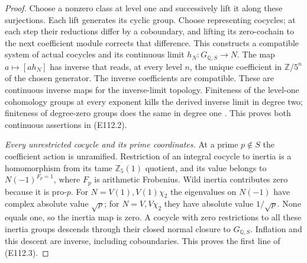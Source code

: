 \begin{proof}
Choose a nonzero class at level one and successively lift
it along these surjections.  Each lift generates its cyclic
group.  Choose representing cocycles; at each step their
reductions differ by a coboundary, and lifting its zero-cochain
to the next coefficient module corrects that difference.
This constructs a compatible system of actual cocycles and
its continuous limit $h_N:G_{\mathbb Q,S}\to N$.
The map $a\mapsto[a h_N]$ has inverse that reads, at every
level $n$, the unique coefficient in $\mathbb Z/5^n$ of
the chosen generator.  The inverse coefficients are compatible.
These are continuous inverse maps for the inverse-limit
topology.  Finiteness of the level-one cohomology groups at
every exponent kills the derived inverse limit in degree two;
finiteness of degree-zero groups does the same in degree one
\cite[Proposition 1.6 and Theorem 2.2]{E_JannsenContinuous}.
This proves both continuous assertions in (E112.2).

\emph{Every unrestricted cocycle and its prime coordinates.}
At a prime $p\notin S$ the coefficient action is unramified.
Restriction of an integral cocycle to inertia is a homomorphism
from its tame $\mathbb Z_5(1)$ quotient, and its value belongs
to $N(-1)^{F_p=1}$, where $F_p$ is arithmetic Frobenius.
Wild inertia contributes zero because it is pro-$p$.
For $N=V(1),V(1)\chi_2$ the eigenvalues on $N(-1)$ have
complex absolute value $\sqrt p$; for $N=V,V\chi_2$ they
have absolute value $1/\sqrt p$.  None equals one, so the
inertia map is zero.  A cocycle with zero restrictions to
all these inertia groups descends through their closed
normal closure to $G_{\mathbb Q,S}$.  Inflation and this
descent are inverse, including coboundaries.  This proves
the first line of (E112.3).


\end{proof}
